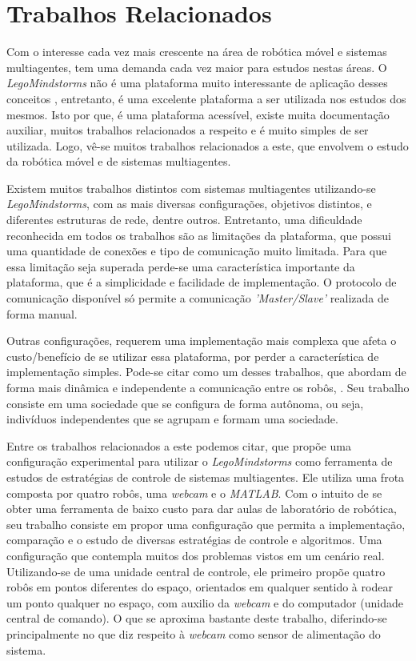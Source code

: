 %
%
\chapter{Trabalhos Relacionados}
\label{chap:trabalhosRelacionados}
Com o interesse cada vez mais crescente na área de robótica móvel e sistemas multiagentes, tem uma demanda cada vez maior para estudos nestas áreas. O \emph{Lego\textregistered Mindstorms} não é uma plataforma muito interessante de aplicação desses conceitos , entretanto, é uma excelente plataforma a ser utilizada nos estudos dos mesmos. Isto por que, é uma plataforma acessível, existe muita documentação auxiliar, muitos trabalhos relacionados a respeito e é muito simples de ser utilizada. Logo, vê-se muitos trabalhos relacionados a este, que envolvem o estudo da robótica móvel e de sistemas multiagentes.

Existem muitos trabalhos distintos com sistemas multiagentes utilizando-se \emph{Lego\textregistered Mindstorms}, com as mais diversas configurações, objetivos distintos, e diferentes estruturas de rede, dentre outros. Entretanto, uma dificuldade reconhecida em todos os trabalhos são as limitações da plataforma, que possui uma quantidade de conexões e tipo de comunicação muito limitada. Para que essa limitação seja superada perde-se uma característica importante da plataforma, que é a simplicidade e facilidade de implementação. O protocolo de comunicação disponível só permite a comunicação \emph{'Master/Slave'} realizada de forma manual. 

Outras configurações, requerem uma implementação mais complexa que afeta o custo/benefício de se utilizar essa plataforma, por perder a característica de implementação simples. Pode-se citar como um desses trabalhos, que abordam de forma mais dinâmica e independente a comunicação entre os robôs, . Seu trabalho consiste em uma sociedade que se configura de forma autônoma, ou seja,  indivíduos independentes que se agrupam e formam uma sociedade.

Entre os trabalhos relacionados a este podemos citar,  que propõe uma configuração experimental para utilizar o \emph{Lego\textregistered Mindstorms} como ferramenta de estudos de estratégias de controle de sistemas multiagentes. Ele utiliza uma frota composta por quatro robôs, uma \emph{webcam} e o \emph{MATLAB\textregistered}. Com o intuito de se obter uma ferramenta de baixo custo para dar aulas de laboratório de robótica, seu trabalho consiste em propor uma configuração que permita a implementação, comparação e o estudo de diversas estratégias de controle e algoritmos. Uma configuração que contempla muitos dos problemas vistos em um cenário real. Utilizando-se de uma unidade central de controle, ele primeiro propõe quatro robôs em pontos diferentes do espaço, orientados em qualquer sentido à rodear um ponto qualquer no espaço, com auxilio da \emph{webcam} e do computador (unidade central de comando). O que se aproxima bastante deste trabalho, diferindo-se principalmente no que diz respeito à \emph{webcam} como sensor de alimentação do sistema.


